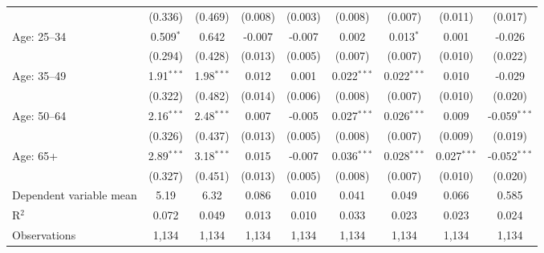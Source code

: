 \begin{table}
{\begin{tabular}[t]{lcccccccc}
 & (0.336) & (0.469) & (0.008) & (0.003) & (0.008) & (0.007) & (0.011) & (0.017)\\
Age: 25--34 & 0.509$^{*}$ & 0.642 & -0.007 & -0.007 & 0.002 & 0.013$^{*}$ & 0.001 & -0.026\\
 & (0.294) & (0.428) & (0.013) & (0.005) & (0.007) & (0.007) & (0.010) & (0.022)\\
Age: 35--49 & 1.91$^{***}$ & 1.98$^{***}$ & 0.012 & 0.001 & 0.022$^{***}$ & 0.022$^{***}$ & 0.010 & -0.029\\
 & (0.322) & (0.482) & (0.014) & (0.006) & (0.008) & (0.007) & (0.010) & (0.020)\\
Age: 50--64 & 2.16$^{***}$ & 2.48$^{***}$ & 0.007 & -0.005 & 0.027$^{***}$ & 0.026$^{***}$ & 0.009 & -0.059$^{***}$\\
 & (0.326) & (0.437) & (0.013) & (0.005) & (0.008) & (0.007) & (0.009) & (0.019)\\
Age: 65+ & 2.89$^{***}$ & 3.18$^{***}$ & 0.015 & -0.007 & 0.036$^{***}$ & 0.028$^{***}$ & 0.027$^{***}$ & -0.052$^{***}$\\
 & (0.327) & (0.451) & (0.013) & (0.005) & (0.008) & (0.007) & (0.010) & (0.020)\\
Dependent variable mean & 5.19 & 6.32 & 0.086 & 0.010 & 0.041 & 0.049 & 0.066 & 0.585\\
R$^2$ & 0.072 & 0.049 & 0.013 & 0.010 & 0.033 & 0.023 & 0.023 & 0.024\\
Observations & 1,134 & 1,134 & 1,134 & 1,134 & 1,134 & 1,134 & 1,134 & 1,134\\
\bottomrule
\end{tabular}}
\end{table}